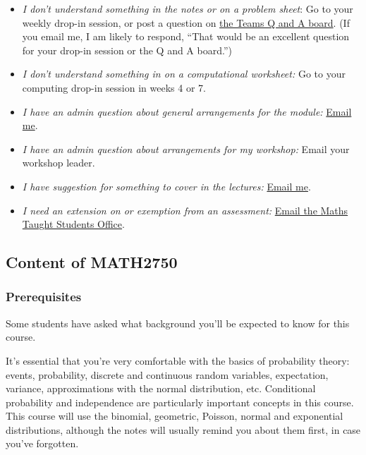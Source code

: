 \documentclass[
  a4paper,
]{article}
\providecommand{\tightlist}{%
  \setlength{\itemsep}{0pt}\setlength{\parskip}{0pt}}
\theoremstyle{definition}
\theoremstyle{definition}
\theoremstyle{definition}
\theoremstyle{remark}
\begin{document}
\begin{itemize}
\tightlist
\item
  \emph{I don't understand something in the notes or on a problem sheet}: Go to your weekly drop-in session, or post a question on \href{https://teams.microsoft.com/l/channel/19\%3a5fcd058b7074426ca1f7d1cf2052d3b4\%40thread.tacv2/Q\%2520and\%2520A?groupId=1c138eac-0c54-43b0-9d20-d4cf3d65c40a\&tenantId=bdeaeda8-c81d-45ce-863e-5232a535b7cb}{the Teams Q and A board}. (If you email me, I am likely to respond, ``That would be an excellent question for your drop-in session or the Q and A board.'')
\item
  \emph{I don't understand something in on a computational worksheet:} Go to your computing drop-in session in weeks 4 or 7.
\item
  \emph{I have an admin question about general arrangements for the module:} \href{mailto:m.aldridge@leeds.ac.uk}{Email me}.
\item
  \emph{I have an admin question about arrangements for my workshop:} Email your workshop leader.
\item
  \emph{I have suggestion for something to cover in the lectures:} \href{mailto:m.aldridge@leeds.ac.uk}{Email me}.
\item
  \emph{I need an extension on or exemption from an assessment:} \href{mailto:Maths.Taught.Students@leeds.ac.uk}{Email the Maths Taught Students Office}.
\end{itemize}

\hypertarget{about-content}{%
\subsection*{Content of MATH2750}\label{about-content}}

\hypertarget{prereqs}{%
\subsubsection*{Prerequisites}\label{prereqs}}

Some students have asked what background you'll be expected to know for this course.

It's essential that you're very comfortable with the basics of probability theory: events, probability, discrete and continuous random variables, expectation, variance, approximations with the normal distribution, etc. Conditional probability and independence are particularly important concepts in this course. This course will use the binomial, geometric, Poisson, normal and exponential distributions, although the notes will usually remind you about them first, in case you've forgotten.
\end{document}
